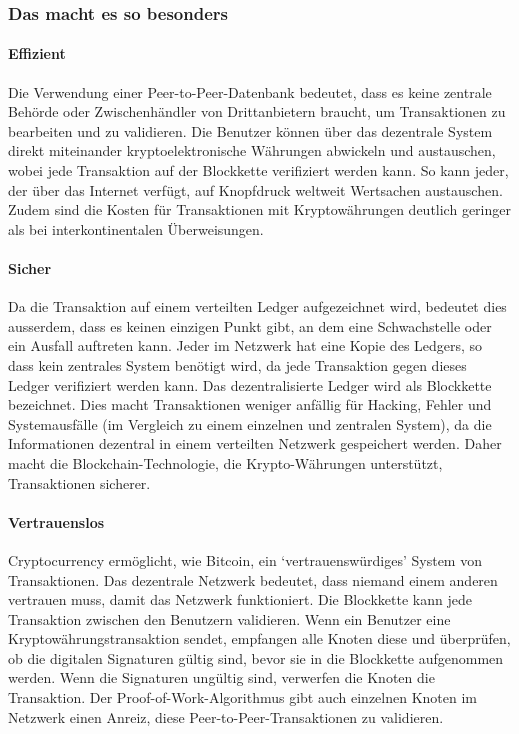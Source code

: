 \documentclass[10pt,a4paper]{article}
\begin{document}
\subsubsection*{Das macht es so besonders}
\paragraph*{Effizient}
Die Verwendung einer Peer-to-Peer-Datenbank bedeutet, dass es keine zentrale Behörde oder Zwischenhändler von Drittanbietern braucht, um Transaktionen zu bearbeiten und zu validieren. Die Benutzer können über das dezentrale System direkt miteinander kryptoelektronische Währungen abwickeln und austauschen, wobei jede Transaktion auf der Blockkette verifiziert werden kann. So kann jeder, der über das Internet verfügt, auf Knopfdruck weltweit Wertsachen austauschen. Zudem sind die Kosten für Transaktionen mit Kryptowährungen deutlich geringer als bei interkontinentalen Überweisungen.

\paragraph*{Sicher}
Da die Transaktion auf einem verteilten Ledger aufgezeichnet wird, bedeutet dies ausserdem, dass es keinen einzigen Punkt gibt, an dem eine Schwachstelle oder ein Ausfall auftreten kann. Jeder im Netzwerk hat eine Kopie des Ledgers, so dass kein zentrales System benötigt wird, da jede Transaktion gegen dieses Ledger verifiziert werden kann. Das dezentralisierte Ledger wird als Blockkette bezeichnet. Dies macht Transaktionen weniger anfällig für Hacking, Fehler und Systemausfälle (im Vergleich zu einem einzelnen und zentralen System), da die Informationen dezentral in einem verteilten Netzwerk gespeichert werden. Daher macht die Blockchain-Technologie, die Krypto-Währungen unterstützt, Transaktionen sicherer.

\paragraph*{Vertrauenslos}
Cryptocurrency ermöglicht, wie Bitcoin, ein `vertrauenswürdiges' System von Transaktionen. Das dezentrale Netzwerk bedeutet, dass niemand einem anderen vertrauen muss, damit das Netzwerk funktioniert. Die Blockkette kann jede Transaktion zwischen den Benutzern validieren. Wenn ein Benutzer eine Kryptowährungstransaktion sendet, empfangen alle Knoten diese und überprüfen, ob die digitalen Signaturen gültig sind, bevor sie in die Blockkette aufgenommen werden. Wenn die Signaturen ungültig sind, verwerfen die Knoten die Transaktion. Der Proof-of-Work-Algorithmus gibt auch einzelnen Knoten im Netzwerk einen Anreiz, diese Peer-to-Peer-Transaktionen zu validieren.
\end{document}
